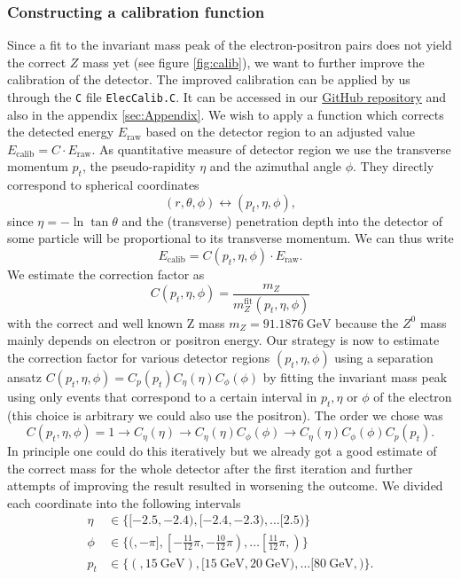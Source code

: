 \documentclass[11pt,a4paper,notitlepage]{scrartcl}
\begin{document}
\subsubsection{Constructing a calibration function}
Since a fit to the invariant mass peak of the electron-positron pairs does not yield the correct $Z$ mass yet (see figure \ref{fig:calib}), we want to further improve the calibration of the detector. The improved calibration can be applied by us through the \texttt{C} file \texttt{ElecCalib.C}. It can be accessed in our \href{https://github.com/krausejm/advanced_lab_course}{GitHub repository} and also in the appendix \ref{sec:Appendix}. We wish to apply a function which corrects the detected energy $E_\text{raw}$ based on the detector region to an adjusted value $E_\text{calib}=C\cdot E_\text{raw}$. As quantitative measure of detector region we use the transverse momentum $p_t$, the pseudo-rapidity $\eta$ and the azimuthal angle $\phi$. They directly correspond to spherical coordinates $$(r,\theta,\phi)\leftrightarrow(p_t,\eta,\phi),$$
since $\eta=-\ln\tan\theta$ and the (transverse) penetration depth into the detector of some particle will be proportional to its transverse momentum. We can thus write $$E_\text{calib}=C(p_t,\eta,\phi)\cdot E_\text{raw}.$$ We estimate the correction factor as $$C(p_t,\eta,\phi)=\frac{m_Z}{m_Z^\text{fit}(p_t,\eta,\phi)}$$ with the correct and well known Z mass $m_Z=\SI{91.1876}{\giga\eV}$ \cite{pdg} because the $Z^0$ mass mainly depends on electron or positron energy. Our strategy is now to estimate the correction factor for various detector regions $(p_t,\eta,\phi)$ using a separation ansatz $C(p_t,\eta,\phi)=C_p(p_t)C_\eta(\eta)C_\phi(\phi)$ by fitting the invariant mass peak using only events that correspond to a certain interval in $p_t,\eta$ or $\phi$ of the electron (this choice is arbitrary we could also use the positron). The order we chose was $$C(p_t,\eta,\phi)=1\to C_\eta(\eta)\to C_\eta(\eta)C_\phi(\phi)\to C_\eta(\eta)C_\phi(\phi)C_p(p_t).$$ In principle one could do this iteratively but we already got a good estimate of the correct mass for the whole detector after the first iteration and further attempts of improving the result resulted in worsening the outcome. We divided each coordinate into the following intervals
\begin{align*}
	\eta&\in\{[-2.5,-2.4),[-2.4,-2.3),\dots[2.5)\}\\
	\phi&\in\{(,-\pi],\left[-\frac{11}{12}\pi,-\frac{10}{12}\pi\right),\dots\left[\frac{11}{12}\pi,\right)\}\\
	p_t&\in\{(,\SI{15}{\giga\eV}),[\SI{15}{\giga\eV},\SI{20}{\giga\eV}),\dots[\SI{80}{\giga\eV},)\}.
\end{align*}    
\end{document}
